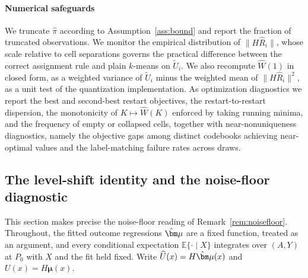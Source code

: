 \documentclass[11pt]{article}
\newcommand{\E}{\mathbb E}
\newcommand{\bmu}{\bm\mu}
\newcommand{\hU}{\widehat U}
\newcommand{\tU}{\widetilde U}
\newcommand{\hR}{\widehat R}
\newcommand{\norm}[1]{\lVert #1\rVert}
\begin{document}
\paragraph{Numerical safeguards}
We truncate $\hat\pi$ according to Assumption~\ref{ass:bound} and report the fraction of truncated observations.  We monitor the empirical distribution of $\norm{H\hR_i}$, whose scale relative to cell separations governs the practical difference between the correct assignment rule and plain $k$-means on $\tU_i$.  We also recompute $\widehat W(1)$ in closed form, as a weighted variance of $\tU_i$ minus the weighted mean of $\norm{H\hR_i}^2$, as a unit test of the quantization implementation.  As optimization diagnostics we report the best and second-best restart objectives, the restart-to-restart dispersion, the monotonicity of $K\mapsto\widehat W(K)$ enforced by taking running minima, and the frequency of empty or collapsed cells, together with near-nonuniqueness diagnostics, namely the objective gaps among distinct codebooks achieving near-optimal values and the label-matching failure rates across draws.

\subsection{The level-shift identity and the noise-floor diagnostic}\label{sec:noisefloor_supp}

This section makes precise the noise-floor reading of Remark~\ref{rem:noisefloor}. Throughout, the fitted outcome regressions $\hat\bmu$ are a fixed function, treated as an argument, and every conditional expectation $\E\{\cdot\mid X\}$ integrates over $(A,Y)$ at $P_0$ with $X$ and the fit held fixed. Write $\hU(x)=H\hat\bmu(x)$ and $U(x)=H\bmu(x)$.
\end{document}
